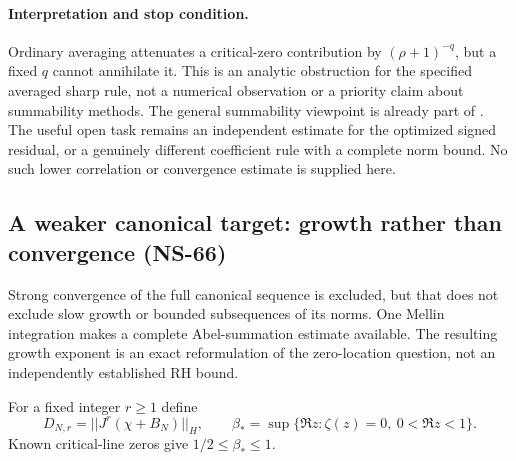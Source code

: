 \documentclass[11pt]{article}
\def\norm#1{||#1||}%
\theoremstyle{remark}
\newcommand{\norm}[1]{\left\lVert #1\right\rVert}
\begin{document}
\paragraph{Interpretation and stop condition.}
Ordinary averaging attenuates a critical-zero contribution by
$(\rho+1)^{-q}$, but a fixed $q$ cannot annihilate it. This is an
analytic obstruction for the specified averaged sharp rule, not a
numerical observation or a priority claim about summability methods.
The general summability viewpoint is already part of
\cite[Section 3]{BaezDuarteStrong}. The useful open task remains an
independent estimate for the optimized signed residual, or a genuinely
different coefficient rule with a complete norm bound. No such lower
correlation or convergence estimate is supplied here.

\subsection{A weaker canonical target: growth rather than convergence (NS-66)}
\label{sec:ns66-canonical-growth}

Strong convergence of the full canonical sequence is excluded, but
that does not exclude slow growth or bounded subsequences of its norms.
One Mellin integration makes a complete Abel-summation estimate
available. The resulting growth exponent is an exact reformulation
of the zero-location question, not an independently established RH bound.

For a fixed integer $r\geq1$ define
\[
 D_{N,r}=\norm{J^r(\chi+B_N)}_H,\qquad
 \beta_* =\sup\{\Re z:\zeta(z)=0,\ 0<\Re z<1\}.
\]
Known critical-line zeros give $1/2\leq\beta_*\leq1$.
\end{document}
